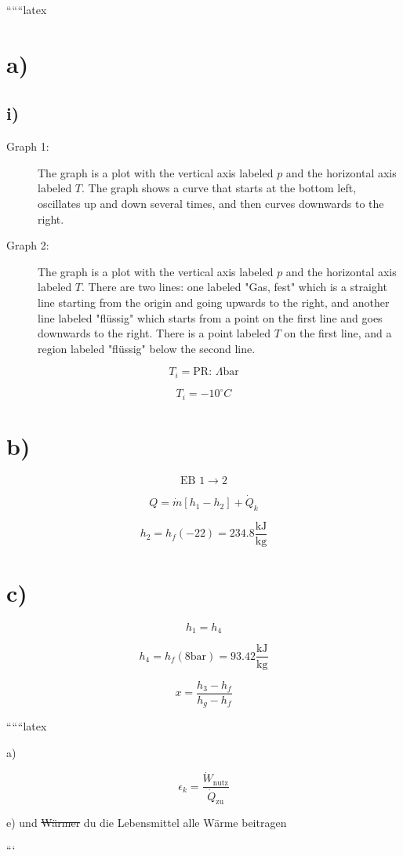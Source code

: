 
``````latex


\section*{a)}

\subsection*{i)}

\begin{description}
    \item[Graph 1:] The graph is a plot with the vertical axis labeled \( p \) and the horizontal axis labeled \( T \). The graph shows a curve that starts at the bottom left, oscillates up and down several times, and then curves downwards to the right.
    \item[Graph 2:] The graph is a plot with the vertical axis labeled \( p \) and the horizontal axis labeled \( T \). There are two lines: one labeled "Gas, fest" which is a straight line starting from the origin and going upwards to the right, and another line labeled "flüssig" which starts from a point on the first line and goes downwards to the right. There is a point labeled \( T \) on the first line, and a region labeled "flüssig" below the second line.
\end{description}

\[
T_i = \text{PR: } \Lambda \text{bar}
\]

\[
T_i = -10^\circ C
\]

\section*{b)}

\[
\text{EB 1} \rightarrow 2
\]

\[
Q = \dot{m} \left[ h_1 - h_2 \right] + \dot{Q}_k
\]

\[
h_2 = h_f(-22) = 234.8 \frac{\text{kJ}}{\text{kg}}
\]

\section*{c)}

\[
h_1 = h_4
\]

\[
h_4 = h_f(8 \text{bar}) = 93.42 \frac{\text{kJ}}{\text{kg}}
\]

\[
x = \frac{h_3 - h_f}{h_g - h_f}
\]

``````latex


a)

\[
\epsilon_k = \frac{\dot{W}_{\text{nutz}}}{\dot{Q}_{\text{zu}}}
\]

e) und \sout{Wärmer} du die Lebensmittel alle Wärme beitragen

```